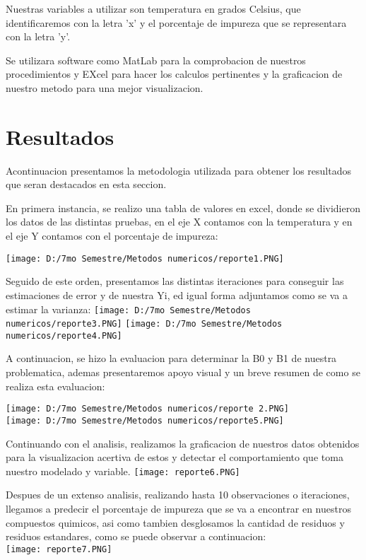 \documentclass[12pt,a4paper]{report}
\begin{document}
Nuestras variables a utilizar son temperatura en grados Celsius, que identificaremos con la letra 'x' y el porcentaje de impureza que se representara con la letra 'y'.

Se utilizara software como MatLab para la comprobacion de nuestros procedimientos y EXcel para hacer los calculos pertinentes y la graficacion de nuestro metodo para una mejor visualizacion.

\section{Resultados}
Acontinuacion presentamos la metodologia utilizada para obtener los resultados que seran destacados en esta seccion.

En primera instancia, se realizo una tabla de valores en excel, donde se dividieron los datos de las distintas pruebas, en el eje X contamos con la temperatura y en el eje Y contamos con el porcentaje de impureza:

\texttt{[image: D:/7mo Semestre/Metodos numericos/reporte1.PNG]} 
\centering 

Seguido de este orden, presentamos las distintas iteraciones para conseguir las estimaciones de error y de nuestra Yi, ed igual forma adjuntamos como se va a estimar la varianza:
\texttt{[image: D:/7mo Semestre/Metodos numericos/reporte3.PNG]} 
\texttt{[image: D:/7mo Semestre/Metodos numericos/reporte4.PNG]} 

A continuacion, se hizo la evaluacion para determinar la B0 y B1 de nuestra problematica, ademas presentaremos apoyo visual y un breve resumen de como se realiza esta evaluacion:

\texttt{[image: D:/7mo Semestre/Metodos numericos/reporte 2.PNG]} 
\\

\texttt{[image: D:/7mo Semestre/Metodos numericos/reporte5.PNG]} 

Continuando con el analisis, realizamos la graficacion de nuestros datos obtenidos para la visualizacion acertiva de estos y detectar el comportamiento que toma nuestro modelado y variable.
\texttt{[image: reporte6.PNG]} 

Despues de un extenso analisis, realizando hasta 10 observaciones o iteraciones, llegamos a predecir el porcentaje de impureza que se va a encontrar en nuestros compuestos quimicos, asi como tambien desglosamos la cantidad de residuos y residuos estandares, como se puede observar a continuacion:
\\
\texttt{[image: reporte7.PNG]} 
\end{document}
